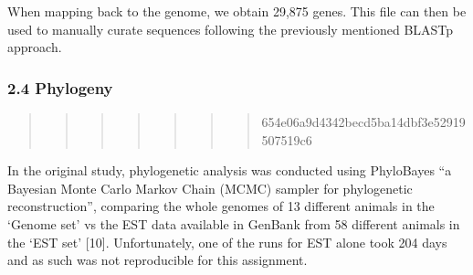 \documentclass[
]{article}
\newenvironment{Shaded}{\begin{snugshade}}{\end{snugshade}}
\newcommand{\CommentTok}[1]{\textcolor[rgb]{0.56,0.35,0.01}{\textit{#1}}}
\newcommand{\ExtensionTok}[1]{#1}
\newcommand{\FunctionTok}[1]{\textcolor[rgb]{0.00,0.00,0.00}{#1}}
\newcommand{\NormalTok}[1]{#1}
\newcommand{\OperatorTok}[1]{\textcolor[rgb]{0.81,0.36,0.00}{\textbf{#1}}}
\newcommand{\StringTok}[1]{\textcolor[rgb]{0.31,0.60,0.02}{#1}}
\begin{document}
\begin{Shaded}
\end{Shaded}

When mapping back to the genome, we obtain 29,875 genes. This file can
then be used to manually curate sequences following the previously
mentioned BLASTp approach.

\hypertarget{phylogeny}{%
\subsubsection{2.4 Phylogeny}\label{phylogeny}}

\begin{quote}
\begin{quote}
\begin{quote}
\begin{quote}
\begin{quote}
\begin{quote}
\begin{quote}
654e06a9d4342becd5ba14dbf3e52919507519c6
\end{quote}
\end{quote}
\end{quote}
\end{quote}
\end{quote}
\end{quote}
\end{quote}

In the original study, phylogenetic analysis was conducted using
PhyloBayes ``a Bayesian Monte Carlo Markov Chain (MCMC) sampler for
phylogenetic reconstruction'', comparing the whole genomes of 13
different animals in the `Genome set' vs the EST data available in
GenBank from 58 different animals in the `EST set' {[}10{]}.
Unfortunately, one of the runs for EST alone took 204 days and as such
was not reproducible for this assignment.
\end{document}
